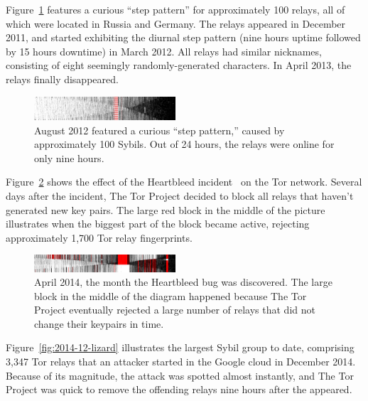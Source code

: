 Figure~\ref{fig:2012-08-steppattern} features a curious ``step pattern'' for
approximately 100 relays, all of which were located in Russia and Germany.  The
relays appeared in December 2011, and started exhibiting the diurnal step
pattern (nine hours uptime followed by 15 hours downtime) in March 2012.  All
relays had similar nicknames, consisting of eight seemingly randomly-generated
characters.  In April 2013, the relays finally disappeared.

\begin{figure}[t]
	\centering
	\includegraphics[width=0.47\textwidth]{diagrams/2012-08.jpg}
	\caption{August 2012 featured a curious ``step pattern,'' caused by
	approximately 100 Sybils.  Out of 24 hours, the relays were online for only
	nine hours.}
	\label{fig:2012-08-steppattern}
\end{figure}

Figure~\ref{fig:2014-04-heartbleed} shows the effect of the Heartbleed
incident~\cite{Durumeric2014a} on the Tor network.  Several days after the
incident, The Tor Project decided to block all relays that haven't generated new
key pairs.  The large red block in the middle of the picture illustrates when
the biggest part of the block became active, rejecting approximately 1,700 Tor
relay fingerprints.

\begin{figure}[t]
	\centering
	\includegraphics[width=0.47\textwidth]{diagrams/heartbleed-uptimes.jpg}
	\caption{April 2014, the month the Heartbleed bug was discovered.
		The large block in the middle of the diagram happened because The
		Tor Project eventually rejected a large number of relays that did not
		change their keypairs in time.}
		\label{fig:2014-04-heartbleed}
\end{figure}

Figure~\ref{fig:2014-12-lizard} illustrates the largest Sybil group to date,
comprising 3,347 Tor relays that an attacker started in the Google cloud in
December 2014.  Because of its magnitude, the attack was spotted almost
instantly, and The Tor Project was quick to remove the offending relays nine
hours after the appeared.

